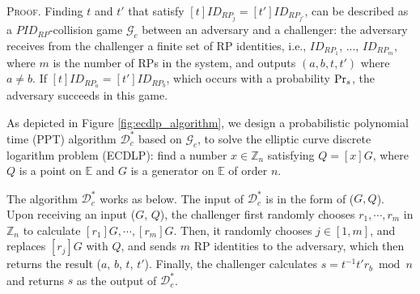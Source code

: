 \oldc
\vspace{0.85mm}
\noindent\textsc{Proof.}
Finding $t$ and $t'$ that satisfy $[t]ID_{RP_j} = [t']ID_{RP_{j'}}$, can be described as a $PID_{RP}$-collision game $\mathcal{G}_c$ between an adversary and a challenger: the adversary receives from the challenger a finite set of RP identities, i.e., $ID_{RP_1}$, ..., $ID_{RP_m}$, where $m$ is the number of RPs in the system, and outputs $(a, b, t, t')$ where $a \neq b$. If $[t]ID_{RP_a}=[t']ID_{RP_b}$, which occurs with a probability ${\rm Pr}_s$, the adversary succeeds in this game.

As depicted in Figure \ref{fig:ecdlp_algorithm}, we design a probabilistic polynomial time (PPT) algorithm $\mathcal{D}^*_c$
    based on $\mathcal{G}_c$, to solve the elliptic curve discrete logarithm problem (ECDLP): find a number $x \in \mathbb{Z}_n$ satisfying $Q = [x]G$,
where $Q$ is a point on $\mathbb{E}$ and $G$ is a generator on $\mathbb{E}$ of order $n$.


The algorithm $\mathcal{D}^*_c$ works as below.
The input of $\mathcal{D}^*_c$ is in the form of ($G, Q$). Upon receiving an input ($G$, $Q$), the challenger first randomly chooses $r_1, \cdots, r_m$ in $\mathbb{Z}_n$ to calculate $[r_1]G, \cdots, [r_m]G$.
Then, it randomly chooses $j \in [1,m]$, and replaces $[r_j]G$ with $Q$, and sends $m$ RP identities to the adversary, which then returns the result ($a$, $b$, $t$, $t'$). Finally, the challenger calculates $s = t^{-1}t'r_b \bmod n$ and returns $s$ as the output of $\mathcal{D}^*_c$.

